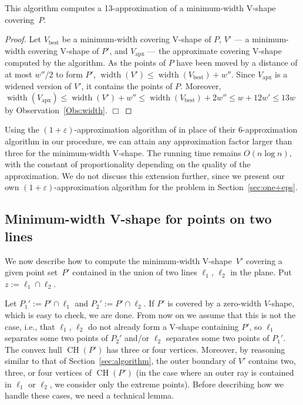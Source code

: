 \documentclass{llncs}
\newcommand{\Vbest}{V_{\mathrm{best}}}
\newcommand{\Vapp}{V_{\mathrm{apx}}}
\let\eps\varepsilon
\DeclareMathOperator{\conv}{CH}
\DeclareMathOperator{\width}{width}
\begin{document}
\begin{theorem}
This algorithm computes a 13-approximation of a minimum-width V-shape covering~$P$.
\end{theorem}
\begin{proof}
  Let $\Vbest$ be a minimum-width covering V-shape of $P$, $V'$ --- a
  minimum-width covering V-shape of $P'$, and $\Vapp$ --- the approximate
  covering V-shape computed by the algorithm.
  As the points of $P$ have been moved by a distance
  of at most $w''/2$ to form $P'$, $\width(V') \leq \width(\Vbest) + w''$.
  Since $\Vapp$ is a widened version of $V'$, it contains the points
  of $P$.  Moreover, $\width(\Vapp) \leq \width(V') + w'' \leq
  \width(\Vbest) + 2 w'' \leq w +12 w' \leq 13 w$ by
  Observation~\ref{Obs:width}. \hfill $\Box$
\end{proof}

\begin{uremark}
  Using the $(1+\eps)$-approximation
  algorithm of \cite{2-line-center} in place of their 6-approximation
  algorithm in our procedure, we can attain any approximation factor
  larger than 
  three for the minimum-width V-shape.  The running time remains $O(n
  \log n)$, with the constant of proportionality depending on the
  quality of the approximation.  We do not discuss this extension further,
  since we present our own $(1+\eps)$-approximation algorithm for the
  problem in Section~\ref{sec:one+eps}.
\end{uremark}

\subsection{Minimum-width V-shape for points on two lines}
\label{sec:two-lines}

We now describe how to compute the minimum-width V-shape~$V'$ covering
a given point set~$P'$ contained in the union of two lines $\ell_1$, $\ell_2$
in the plane.  Put $z:=\ell_1 \cap \ell_2$.

Let $P_1':=P' \cap \ell_1$ and $P_2':=P'\cap \ell_2$.  If $P'$ is
covered by a zero-width $V$-shape, which is easy to check, we are
done.  From now on we assume that this is not the case, i.e.,
that $\ell_1$, $\ell_2$ do not already form a V-shape
containing $P'$, so $\ell_1$ separates some two points of $P_2'$ and/or $\ell_2$
separates some two points of $P_1'$.  The convex hull $\conv(P')$ has
three or four vertices.  Moreover, by reasoning similar to that of
Section~\ref{sec:algorithm}, the outer boundary of $V'$ 
contains two, three, or four vertices of $\conv(P')$ (in the case where 
an outer ray is contained in $\ell_1$ or $\ell_2$, we consider only
the extreme points).  Before describing
how we handle these cases, we need a technical lemma.
\end{document}
